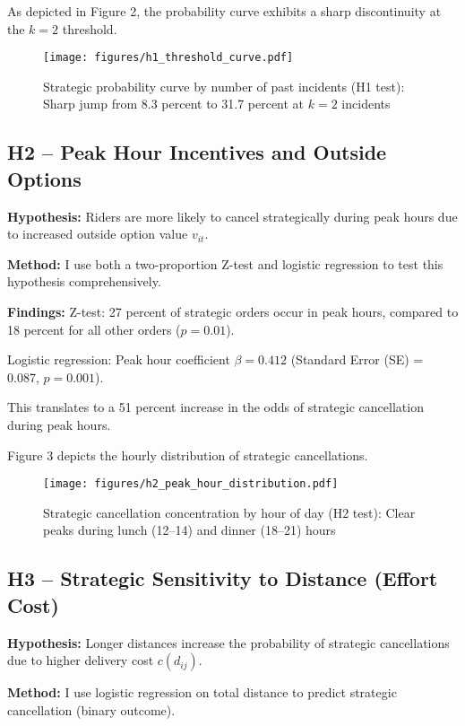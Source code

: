 As depicted in Figure 2, the probability curve exhibits a sharp discontinuity at the $k = 2$ threshold.

\begin{figure}[H]
\centering
\texttt{[image: figures/h1\_threshold\_curve.pdf]}
\caption{Strategic probability curve by number of past incidents (H1 test): Sharp jump from 8.3 percent to 31.7 percent at $k = 2$ incidents}
\label{fig:h1_curve}
\end{figure}

\subsection{H2 -- Peak Hour Incentives and Outside Options}

\textbf{Hypothesis:} Riders are more likely to cancel strategically during peak hours due to increased outside option value $v_{it}$.

\textbf{Method:} I use both a two-proportion Z-test and logistic regression to test this hypothesis comprehensively.

\textbf{Findings:}  
Z-test: 27 percent of strategic orders occur in peak hours, compared to 18 percent for all other orders ($p = 0.01$).

Logistic regression: Peak hour coefficient $\beta = 0.412$ (Standard Error (SE) = 0.087, $p = 0.001$).

This translates to a 51 percent increase in the odds of strategic cancellation during peak hours.

Figure 3 depicts the hourly distribution of strategic cancellations.

\begin{figure}[H]
\centering
\texttt{[image: figures/h2\_peak\_hour\_distribution.pdf]}
\caption{Strategic cancellation concentration by hour of day (H2 test): Clear peaks during lunch (12--14) and dinner (18--21) hours}
\label{fig:h2_distribution}
\end{figure}

\subsection{H3 -- Strategic Sensitivity to Distance (Effort Cost)}

\textbf{Hypothesis:} Longer distances increase the probability of strategic cancellations due to higher delivery cost $c(d_{ij})$.

\textbf{Method:} I use logistic regression on total distance to predict strategic cancellation (binary outcome).

